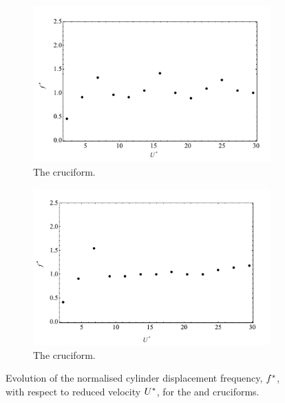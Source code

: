 \documentclass[oneside]{utmthesis}
\begin{document}
\begin{figure}
  \centering
  \begin{subfigure}[h]{1\textwidth}
    \includegraphics[width=\textwidth]{figs/yStrFreq4}
    \caption{The \angfo{} cruciform.}
    \label{fig:yStrFreq4}
  \end{subfigure}
  
  \begin{subfigure}[h]{1\textwidth}
    \includegraphics[width=\textwidth]{figs/yStrFreq3}
    \caption{The \angth{} cruciform.}
    \label{fig:yStrFreq3}
  \end{subfigure}

  \caption{Evolution of the normalised cylinder displacement frequency, $f^{*}$, with respect to reduced velocity $U^{*}$, for the \angfo{} and \angth{} cruciforms.}
  \label{fig:yStrFreq43}
\end{figure}
\end{document}

